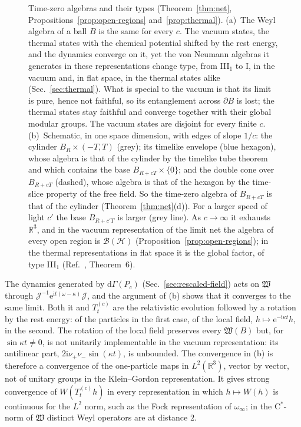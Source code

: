 \documentclass[%
 aip,
 jmp,
 amsmath,amssymb,
 reprint, onecolumn
]{revtex4-1}
\theoremstyle{definition}
\theoremstyle{remark}
\newcommand{\R}{\mathbb{R}}
\newcommand{\Hil}{\mathcal{H}}
\newcommand{\rmd}{\mathrm{d}}
\newcommand{\rmi}{\mathrm{i}}
\newcommand{\rme}{\mathrm{e}}
\begin{document}
\begin{figure}[htb]
\caption{Time-zero algebras and their types (Theorem~\ref{thm:net},
Propositions~\ref{prop:open-regions} and~\ref{prop:thermal}). (a)~The
Weyl algebra of a ball $B$ is the same for every $c$. The vacuum states,
the thermal states with the chemical potential shifted by the rest
energy, and the dynamics converge on it, yet the von Neumann algebras
it generates in these representations change type, from III$_1$ to I,
in the vacuum and, in flat space, in the thermal states alike
(Sec.~\ref{sec:thermal}). What is special to
the vacuum is that its limit is pure, hence not faithful, so its
entanglement across $\partial B$ is lost; the thermal states stay
faithful and converge together with their global modular groups. The
vacuum states are disjoint for every finite $c$. (b)~Schematic, in one
space dimension, with edges of slope $1/c$: the cylinder
$B_R\times(-T,T)$ (grey); its timelike envelope (blue hexagon), whose
algebra is that of the cylinder by the timelike tube theorem and which
contains the base $B_{R+cT}\times\{0\}$; and the double cone over
$B_{R+cT}$ (dashed), whose algebra is that of the hexagon by the
time-slice property of the free field. So the time-zero algebra of
$B_{R+cT}$ is that of the cylinder (Theorem~\ref{thm:net}(d)). For a
larger speed of light $c'$ the base $B_{R+c'T}$ is larger (grey line).
As $c\to\infty$ it exhausts $\R^3$, and in the vacuum representation of
the limit net the algebra of every open region is $\mathcal{B}(\Hil)$
(Proposition~\ref{prop:open-regions}); in the thermal representations
in flat space it is the global factor, of type III$_1$
(Ref.~,
Theorem~6).}
\label{fig:types}
\end{figure}


The dynamics generated by $\rmd\Gamma(P_c)$ (Sec.~\ref{sec:rescaled-field})
acts on $\mathfrak W$ through $\mathcal J^{-1}\rme^{\rmi t(\omega-\kappa)}
\mathcal J$, and the argument of (b) shows that it converges to the same
limit. Both it and $T^{(c)}_t$ are the relativistic evolution followed by
a rotation by the rest energy: of the particles in the first case, of
the local field, $h\mapsto\rme^{-\rmi\kappa t}h$, in the second. The
rotation of the local field preserves every $\mathfrak W(B)$ but, for
$\sin\kappa t\neq0$, is not unitarily implementable in the vacuum
representation: its antilinear part, $2\rmi\nu_+\nu_-\sin(\kappa t)$, is
unbounded. The convergence in (b) is therefore a convergence of the
one-particle maps in $L^2(\R^3)$, vector by vector, not of unitary
groups in the Klein--Gordon representation. It gives strong convergence
of $W(T^{(c)}_th)$ in every representation in which $h\mapsto W(h)$ is
continuous for the $L^2$ norm, such as the Fock representation of
$\omega_\infty$; in the C$^*$-norm of $\mathfrak W$ distinct Weyl
operators are at distance $2$.
\end{document}
